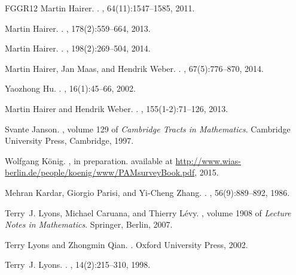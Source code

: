 \documentclass[a4paper,11pt]{article}
\theoremstyle{remark}
\begin{document}
\begin{thebibliography}{FGGR12}
Martin Hairer.
.
, 64(11):1547--1585, 2011.

Martin Hairer.
.
, 178(2):559--664, 2013.

Martin Hairer.
.
, 198(2):269--504, 2014.

Martin Hairer, Jan Maas, and Hendrik Weber.
.
, 67(5):776--870, 2014.

Yaozhong Hu.
.
, 16(1):45--66, 2002.

Martin Hairer and Hendrik Weber.
.
, 155(1-2):71--126, 2013.

Svante Janson.
, volume 129 of {\em {Cambridge
  Tracts in Mathematics}}.
\newblock Cambridge University Press, Cambridge, 1997.

Wolfgang K\"onig.
, in preparation.
\newblock available at \url{http://www.wias-berlin.de/people/koenig/www/PAMsurveyBook.pdf}, 2015.

Mehran Kardar, Giorgio Parisi, and Yi-Cheng Zhang.
.
, 56(9):889--892, 1986.

Terry~J. Lyons, Michael Caruana, and Thierry L{\'e}vy.
, volume 1908 of
  {\em {Lecture Notes in Mathematics}}.
\newblock Springer, Berlin, 2007.

Terry Lyons and Zhongmin Qian.
.
\newblock Oxford University Press, 2002.

Terry~J. Lyons.
.
, 14(2):215--310, 1998.


\end{thebibliography}
\end{document}
